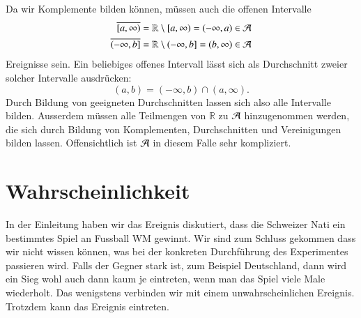 Da wir Komplemente bilden können, müssen auch die offenen Intervalle
\begin{align*}
\overline{[a,\infty)}&=\mathbb R\setminus [a,\infty)=(-\infty,a)\in\cal A\\
\overline{(-\infty,b]}&=\mathbb R\setminus (-\infty,b]= (b,\infty)\in\cal A
\end{align*}
Ereignisse sein.
Ein beliebiges offenes Intervall lässt sich
als Durchschnitt zweier solcher Intervalle ausdrücken:
\[
(a,b)=(-\infty, b)\cap(a,\infty).
\]
Durch Bildung von geeigneten Durchschnitten lassen sich also alle
Intervalle bilden.
Ausserdem müssen alle Teilmengen von $\mathbb R$
zu $\cal A$ hinzugenommen werden, die sich durch Bildung von Komplementen,
Durchschnitten und Vereinigungen bilden lassen.
Offensichtlich ist $\cal A$
in diesem Falle sehr kompliziert.

\section{Wahrscheinlichkeit} \label{section-wahrscheinlichkeit}
In der Einleitung haben wir das Ereignis diskutiert, dass die Schweizer
Nati ein bestimmtes Spiel an Fussball WM gewinnt.
Wir sind zum Schluss
gekommen dass wir nicht wissen können, was bei der konkreten
Durchführung des Experimentes passieren wird.
Falls der Gegner
stark ist, zum Beispiel Deutschland, dann wird ein Sieg wohl auch
dann kaum je eintreten, wenn man das Spiel viele Male wiederholt.
Das wenigstens verbinden wir mit einem unwahrscheinlichen Ereignis.
Trotzdem kann das Ereignis eintreten.


